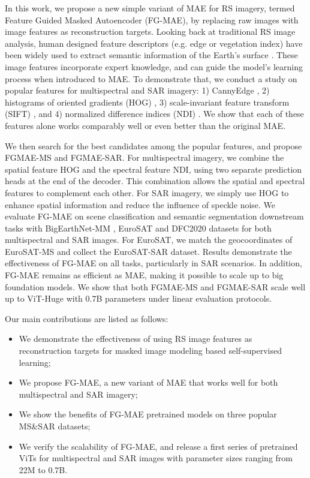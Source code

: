 \documentclass[lettersize,journal]{IEEEtran}
\begin{document}
In this work, we propose a new simple variant of MAE for RS imagery, termed Feature Guided Masked Autoencoder (FG-MAE), by replacing raw images with image features as reconstruction targets. Looking back at traditional RS image analysis, human designed feature descriptors (e.g. edge or vegetation index) have been widely used to extract semantic information of the Earth's surface \cite{ali2001using,lunetta2006land}. These image features incorporate expert knowledge, and can guide the model's learning process when introduced to MAE. To demonstrate that, we conduct a study on popular features for multispectral and SAR imagery: 1) CannyEdge \cite{canny1986computational}, 2) histograms of oriented gradients (HOG) \cite{dalal2005histograms}, 3) scale-invariant feature transform (SIFT) \cite{lowe2004distinctive}, and 4) normalized difference indices (NDI) \cite{pettorelli2013normalized,gao1996ndwi,zha2003use}. We show that each of these features alone works comparably well or even better than the original MAE.

We then search for the best candidates among the popular features, and propose FGMAE-MS and FGMAE-SAR. For multispectral imagery, we combine the spatial feature HOG and the spectral feature NDI, using two separate prediction heads at the end of the decoder. This combination allows the spatial and spectral features to complement each other. For SAR imagery, we simply use HOG to enhance spatial information and reduce the influence of speckle noise. We evaluate FG-MAE on scene classification and semantic segmentation downstream tasks with BigEarthNet-MM \cite{sumbul2021bigearthnet}, EuroSAT \cite{helber2019eurosat} and DFC2020 \cite{schmitt2020ieee} datasets for both multispectral and SAR images. For EuroSAT, we match the geocoordinates of EuroSAT-MS and collect the EuroSAT-SAR dataset. Results demonstrate the effectiveness of FG-MAE on all tasks, particularly in SAR scenarios. In addition, FG-MAE remains as efficient as MAE, making it possible to scale up to big foundation models. We show that both FGMAE-MS and FGMAE-SAR scale well up to ViT-Huge with 0.7B parameters under linear evaluation protocols.

Our main contributions are listed as follows:
\begin{itemize}
\item We demonstrate the effectiveness of using RS image features as reconstruction targets for masked image modeling based self-supervised learning;
\item We propose FG-MAE, a new variant of MAE that works well for both multispectral and SAR imagery;
\item We show the benefits of FG-MAE pretrained models on three popular MS\&SAR datasets;
\item We verify the scalability of FG-MAE, and release a first series of pretrained ViTs for multispectral and SAR images with parameter sizes ranging from 22M to 0.7B.
\end{itemize}
\end{document}
